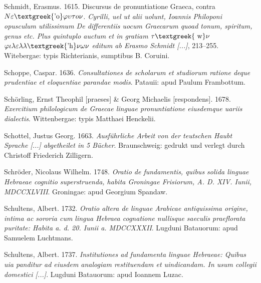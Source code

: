\begin{styleStandard}
Schmidt, Erasmus. 1615. Discursus de pronuntiatione Graeca, contra $N\varepsilon \text{\textgreek{'o}}\varphi \upsilon \tau o\nu $. \textit{Cyrilli, uel ut alii uolunt, Ioannis Philoponi opusculum utilissimum De differentiis uocum Graecarum quoad tonum, spiritum, genus etc. Plus quintuplo auctum et in gratiam $\tau \text{\textgreek{~w}}\nu $ $\varphi \iota \lambda \varepsilon \lambda \lambda \text{\textgreek{'h}}\nu \omega \nu $ editum ab Erasmo Schmidt [...]}, 213–255. Witebergae: typis Richterianis, sumptibus B. Coruini.
\end{styleStandard}

\begin{styleStandard}
Schoppe, Caspar. 1636. \textit{Consultationes de scholarum et studiorum ratione deque prudentiae et eloquentiae parandae modis}. Patauii: apud Paulum Frambottum.
\end{styleStandard}

\begin{styleStandard}
Schörling, Ernst Theophil [praeses] \& Georg Michaelis [respondens]. 1678. \textit{Exercitium philologicum de Graecae linguae pronuntiatione eiusdemque uariis dialectis}. Wittenbergae: typis Matthaei Henckelii.
\end{styleStandard}

\begin{styleStandard}
Schottel, Justus Georg. 1663. \textit{Ausführliche Arbeit von der teutschen Haubt Sprache [...] abgetheilet in 5 Bücher}. Braunschweig: gedrukt und verlegt durch Christoff Friederich Zilligern.
\end{styleStandard}

\begin{styleStandard}
Schröder, Nicolaus Wilhelm. 1748. \textit{Oratio de fundamentis, quibus solida linguae Hebraeae cognitio superstruenda, habita Groningae Frisiorum, A. D. XIV. Iunii, MDCCXLVIII}. Groningae: apud Georgium Spandaw.
\end{styleStandard}

\begin{styleStandard}
Schultens, Albert. 1732. \textit{Oratio altera de linguae Arabicae antiquissima origine, intima ac sororia cum lingua Hebraea cognatione nullisque saeculis praeflorata puritate: Habita a. d. 20. Iunii a. MDCCXXXII}. Lugduni Batauorum: apud Samuelem Luchtmans.
\end{styleStandard}

\begin{styleStandard}
Schultens, Albert. 1737. \textit{Institutiones ad fundamenta linguae Hebraeae: Quibus uia panditur ad eiusdem analogiam restituendam et uindicandam. In usum collegii domestici [...]}. Lugduni Batauorum: apud Ioannem Luzac.
\end{styleStandard}

